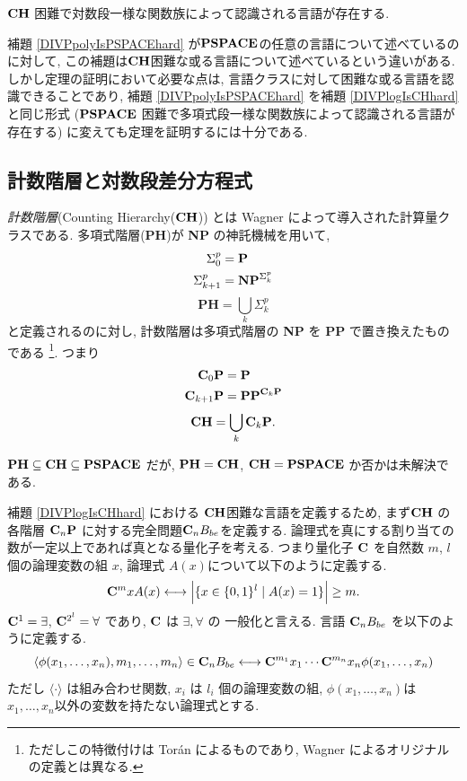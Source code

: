 \begin{lemma}
 \label{DIVPlogIsCHhard}
 $\mathbf{CH}$ 困難で対数段一様な関数族によって認識される言語が存在する.
\end{lemma}

補題 \ref{DIVPpolyIsPSPACEhard} が$\mathbf{PSPACE}$の任意の言語について述べているのに対して,
この補題は$\mathbf{CH}$困難な或る言語について述べているという違いがある.
しかし定理の証明において必要な点は, 言語クラスに対して困難な或る言語を認識できることであり,
補題 \ref{DIVPpolyIsPSPACEhard} を補題 \ref{DIVPlogIsCHhard} と同じ形式
($\mathbf{PSPACE}$ 困難で多項式段一様な関数族によって認識される言語が存在する)
に変えても定理を証明するには十分である.


\subsection{計数階層と対数段差分方程式}
\label{subsection: counting hierarchy}

\emph{計数階層}(Counting Hierarchy($\mathbf{CH}$)) とは
Wagner によって導入された計算量クラスである\cite{wagner1986complexity}.
多項式階層({\bf PH})が {\bf NP} の神託機械を用いて,
\begin{align*}
 \Sigma^p_0 
 &= \mathbf{P} \\
 \Sigma^p_{k+1}
 &= \mathbf{NP}^{\Sigma^p_k}
\end{align*}
\[
 \mathbf{PH} = \bigcup_k \Sigma^p_k
\]
と定義されるのに対し,
計数階層は多項式階層の {\bf NP} を {\bf PP} で置き換えたものである
\footnote{ただしこの特徴付けは Tor{\'a}n によるものであり,
Wagner によるオリジナルの定義とは異なる\cite{toran1991complexity}.
}. つまり
\begin{align*}
 \mathbf{C}_0 \mathbf{P}  
 &= \mathbf{P} \\
 \mathbf{C}_{k+1} \mathbf{P}
 &= \mathbf{PP}^{\mathbf{C}_k \mathbf{P}}
\end{align*}
\[
 \mathbf{CH} = \bigcup_k \mathbf{C}_k \mathbf{P}.
\]

$\mathbf{PH} \subseteq \mathbf{CH} \subseteq \mathbf{PSPACE}$ だが,
$\mathbf{PH} = \mathbf{CH}$, $\mathbf{CH} = \mathbf{PSPACE}$
か否かは未解決である.

補題 \ref{DIVPlogIsCHhard} における $\mathbf{CH}$困難な言語を定義するため, 
まず$\mathbf{CH}$ の各階層 $\mathbf{C}_n \mathbf{P}$ に対する完全問題$\mathbf{C}_n B_{be}$を定義する.
論理式を真にする割り当ての数が一定以上であれば真となる量化子を考える.
つまり量化子 $\mathbf{C}$ を自然数 $m$, $l$ 個の論理変数の組 $x$,
論理式 $A(x)$について以下のように定義する.
\begin{equation}
 \mathbf{C}^m x A(x) 
  \longleftrightarrow 
  \Bigl|\{x \in \{0, 1\}^l \mid A(x) = 1\}\Bigr| \ge m.
\end{equation}
$\mathbf{C}^1 = \exists$, $\mathbf{C}^{2^l} = \forall$ であり, $\mathbf{C}$ は $\exists, \forall$ の
一般化と言える.
言語 $\mathbf{C}_n B_{be}$ を以下のように定義する.
\begin{equation}
 \langle \phi(x_1, \dots, x_n), m_1, \dots, m_n \rangle \in \mathbf{C}_n B_{be}
 \longleftrightarrow
 \mathbf{C}^{m_1}{x_1} \cdots \mathbf{C}^{m_n}{x_n} \phi(x_1, \dots, x_n) 
\end{equation}
ただし $\langle \cdot \rangle$ は組み合わせ関数,
$x_i$ は $l_i$ 個の論理変数の組,
$\phi(x_1, \dots, x_n)$は$x_1, \dots, x_n$以外の変数を持たない論理式とする.


